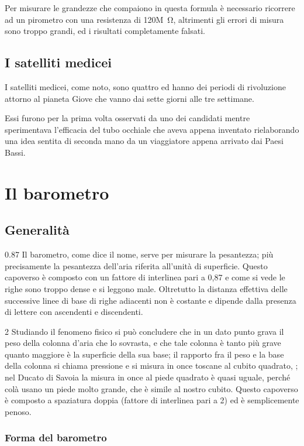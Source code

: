 \documentclass[%
corpo=12pt,
twoside,
stile=classica,
tipotesi=magistrale,
folioinhead,
]{toptesi}
\begin{document}
Per misurare le grandezze che compaiono in questa formula è necessario
ricorrere ad un pirometro con una resistenza di 120\unit{M\ohm}, altrimenti gli errori di misura sono troppo grandi, ed i risultati completamente falsati.

\section{I satelliti medicei}
I satelliti medicei, come noto, sono quattro ed hanno dei periodi di rivoluzione attorno al pianeta Giove che vanno dai sette giorni alle tre settimane.

Essi furono per la prima volta osservati da uno dei candidati mentre
sperimentava l'efficacia del tubo occhiale che aveva appena inventato
rielaborando una idea sentita di seconda mano da un viaggiatore appena arrivato
dai Paesi Bassi.
\chapter{Il barometro}
\section{Generalità}
\begin{interlinea}{0.87} Il barometro, come dice il nome, serve per
misurare la pesantezza; più precisamente la pesantezza dell'aria
riferita all'unità di superficie. Questo capoverso è composto con un fattore di interlinea pari a 0,87 e come si vede le righe sono troppo dense e si leggono male. Oltretutto la distanza effettiva delle successive linee di base di righe adiacenti non è costante e dipende dalla presenza di lettere con ascendenti e discendenti.
\end{interlinea}

\begin{interlinea}{2} Studiando il fenomeno fisico si può concludere
che in un dato punto grava il peso della colonna d'aria che lo
sovrasta, e che tale colonna è tanto più grave quanto maggiore
è la superficie della sua base; il rapporto fra il peso e la base
della colonna si chiama pressione e si misura in once toscane al cubito
quadrato, \cite{tor1}; nel Ducato di Savoia la misura in once al piede
quadrato è quasi uguale, perché colà usano un piede molto
grande, che è simile al nostro cubito. Questo capoverso è composto a spaziatura doppia (fattore di interlinea pari a 2) ed è semplicemente penoso.
\end{interlinea}

\subsection{Forma del barometro}
\end{document}
